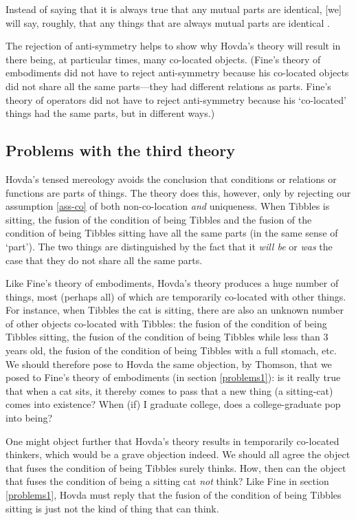 \documentclass[11pt]{article}
\newenvironment{squote}{%
\begin{spacing}{1}
\begin{list}{}{%
\setlength{\labelwidth}{0pt}%
\rightmargin\leftmargin%
}
\item\relax
}{%
\end{list}%
\end{spacing}
}
\begin{document}
\begin{spacing}{1.5}
\begin{squote}
Instead of saying that it is always true that any mutual parts are
identical, [we] will say, roughly, that any things that are always
mutual parts are identical \citep[sec. 3.1.2]{hovda2011}.
\end{squote}

The rejection of anti-symmetry helps to show why Hovda's theory will
result in there being, at particular times, many co-located objects.
(Fine's theory of embodiments did not have to reject anti-symmetry
because his co-located objects did not share all the same parts---they
had different relations as parts.  Fine's theory of operators did not
have to reject anti-symmetry because his `co-located' things had the
same parts, but in different ways.)

\subsection{Problems with the third theory}
\label{problems3}
Hovda's tensed mereology avoids the conclusion that conditions or
relations or functions are parts of things.  The theory does this,
however, only by rejecting our assumption \ref{ass-co} of both
non-co-location {\em and} uniqueness.  When Tibbles is sitting, the
fusion of the condition of being Tibbles and the fusion of the
condition of being Tibbles sitting have all the same parts (in the
same sense of `part').  The two things are distinguished by the fact
that it {\em will be} or {\em was} the case that they do not share all
the same parts.

Like Fine's theory of embodiments, Hovda's theory produces a huge
number of things, most (perhaps all) of which are temporarily
co-located with other things.  For instance, when Tibbles the cat is
sitting, there are also an unknown number of other objects co-located
with Tibbles: the fusion of the condition of being Tibbles sitting,
the fusion of the condition of being Tibbles while less than 3 years
old, the fusion of the condition of being Tibbles with a full stomach,
etc.  We should therefore pose to Hovda the same objection, by
Thomson, that we posed to Fine's theory of embodiments (in section
\ref{problems1}): is it really true that when a cat sits, it thereby
comes to pass that a new thing (a sitting-cat) comes into existence?
When (if) I graduate college, does a college-graduate pop into being?

One might object further that Hovda's theory results in temporarily
co-located thinkers, which would be a grave objection indeed.  We
should all agree the object that fuses the condition of being Tibbles
surely thinks.  How, then can the object that fuses the condition of
being a sitting cat {\em not} think?  Like Fine in section
\ref{problems1}, Hovda must reply that the fusion of the condition of
being Tibbles sitting is just not the kind of thing that can think.


\end{spacing}
\end{document}

